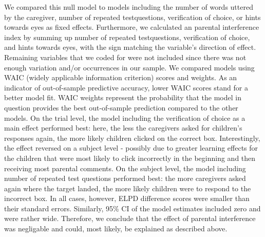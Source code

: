\documentclass[
  man,floatsintext]{apa6}
\begin{document}
We compared this null model to models including the number of words uttered by the caregiver, number of repeated testquestions, verification of choice, or hints towards eyes as fixed effects.
Furthermore, we calculated an parental interference index by summing up number of repeated testquestions, verification of choice, and hints towards eyes, with the sign matching the variable's direction of effect.
Remaining variables that we coded for were not included since there was not enough variation and/or occurrences in our sample.
We compared models using WAIC (widely applicable information criterion) scores and weights.
As an indicator of out-of-sample predictive accuracy, lower WAIC scores stand for a better model fit.
WAIC weights represent the probability that the model in question provides the best out-of-sample prediction compared to the other models.
On the trial level, the model including the verification of choice as a main effect performed best: here, the less the caregivers asked for children's responses again, the more likely children clicked on the correct box.
Interestingly, the effect reversed on a subject level - possibly due to greater learning effects for the children that were most likely to click incorrectly in the beginning and then receiving most parental comments.
On the subject level, the model including number of repeated test questions performed best: the more caregivers asked again where the target landed, the more likely children were to respond to the incorrect box.
In all cases, however, ELPD difference scores were smaller than their standard errors.
Similarly, 95\% CI of the model estimates included zero and were rather wide.
Therefore, we conclude that the effect of parental interference was negligable and could, most likely, be explained as described above.
\end{document}
